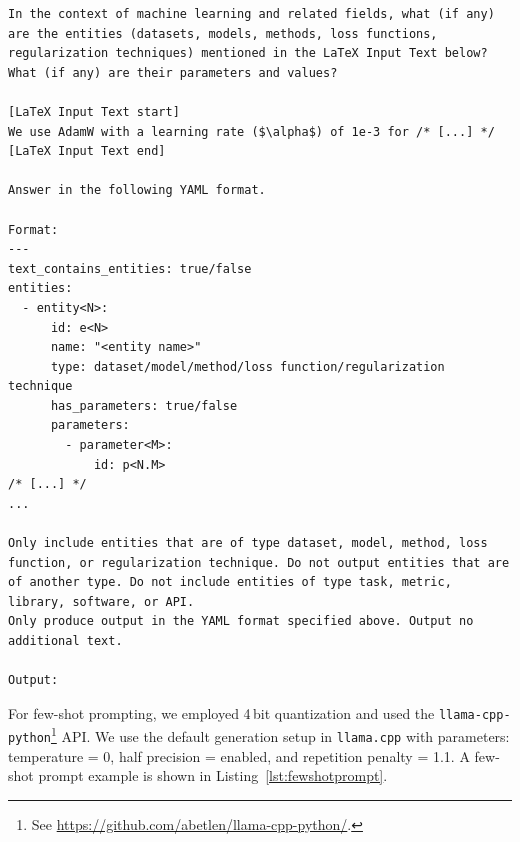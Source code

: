\begin{lstlisting}[language=plain,caption=Prompt example.,label=lst:promptexample,breaklines=true,captionpos=b,frame=single,showlines=true,basicstyle=\tiny\ttfamily]
In the context of machine learning and related fields, what (if any) are the entities (datasets, models, methods, loss functions, regularization techniques) mentioned in the LaTeX Input Text below? What (if any) are their parameters and values?

[LaTeX Input Text start]
We use AdamW with a learning rate ($\alpha$) of 1e-3 for /* [...] */
[LaTeX Input Text end]

Answer in the following YAML format.

Format:
---
text_contains_entities: true/false
entities:
  - entity<N>:
      id: e<N>
      name: "<entity name>"
      type: dataset/model/method/loss function/regularization technique
      has_parameters: true/false
      parameters:
        - parameter<M>:
            id: p<N.M>
/* [...] */
...

Only include entities that are of type dataset, model, method, loss function, or regularization technique. Do not output entities that are of another type. Do not include entities of type task, metric, library, software, or API.
Only produce output in the YAML format specified above. Output no additional text.

Output:
\end{lstlisting}

For few-shot prompting, we employed 4\,bit quantization and used the \texttt{llama-cpp-python}\footnote{See \url{https://github.com/abetlen/llama-cpp-python/}.} API. %
We use the default generation setup in \texttt{llama.cpp}
with parameters: temperature = 0, half precision = enabled, and repetition penalty = 1.1. A few-shot prompt example is shown in Listing~\ref{lst:fewshotprompt}.

